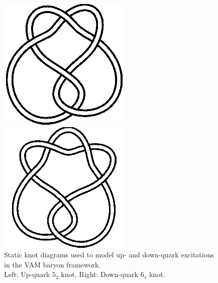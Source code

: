 \documentclass[12pt]{article}
\begin{document}
\begin{figure}[H]
\centering
\begin{minipage}{0.25\textwidth}
    \centering
        \includegraphics[width=\textwidth]{images/5_2.png}
\end{minipage}
\hspace{1em}
\begin{minipage}{0.25\textwidth}
    \centering
        \includegraphics[width=\textwidth]{images/6_1.png}
\end{minipage}
    \caption{Static knot diagrams used to model up- and down-quark excitations in the VAM baryon framework.\\
            Left: Up-quark \(5_2\) knot. Right: Down-quark \(6_1\) knot.}
\end{figure}
\end{document}
